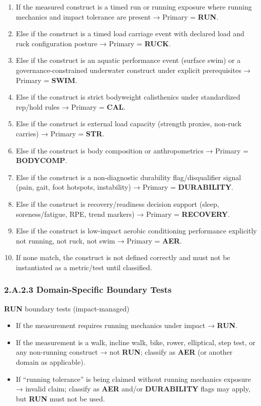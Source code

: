 \documentclass[10pt]{article}
\begin{document}
\begin{enumerate}
\item If the measured construct is a timed run or running exposure where running mechanics and impact tolerance are present → Primary = \textbf{RUN}.
\item Else if the construct is a timed load carriage event with declared load and ruck configuration posture → Primary = \textbf{RUCK}.
\item Else if the construct is an aquatic performance event (surface swim) or a governance-constrained underwater construct under explicit prerequisites → Primary = \textbf{SWIM}.
\item Else if the construct is strict bodyweight calisthenics under standardized rep/hold rules → Primary = \textbf{CAL}.
\item Else if the construct is external load capacity (strength proxies, non-ruck carries) → Primary = \textbf{STR}.
\item Else if the construct is body composition or anthropometrics → Primary = \textbf{BODYCOMP}.
\item Else if the construct is a non-diagnostic durability flag/disqualifier signal (pain, gait, foot hotspots, instability) → Primary = \textbf{DURABILITY}.
\item Else if the construct is recovery/readiness decision support (sleep, soreness/fatigue, RPE, trend markers) → Primary = \textbf{RECOVERY}.
\item Else if the construct is low-impact aerobic conditioning performance explicitly not running, not ruck, not swim → Primary = \textbf{AER}.
\item If none match, the construct is not defined correctly and must not be instantiated as a metric/test until classified.
\end{enumerate}

\subsubsection*{2.A.2.3 Domain-Specific Boundary Tests}

\textbf{RUN} boundary tests (impact-managed)

\begin{itemize}
\item If the measurement requires running mechanics under impact → \textbf{RUN}.
\item If the measurement is a walk, incline walk, bike, rower, elliptical, step test, or any non-running construct → not \textbf{RUN}; classify as \textbf{AER} (or another domain as applicable).
\item If “running tolerance” is being claimed without running mechanics exposure → invalid claim; classify as \textbf{AER} and/or \textbf{DURABILITY} flags may apply, but \textbf{RUN} must not be used.
\end{itemize}
\end{document}
